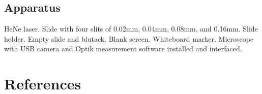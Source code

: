 \documentclass[
  letterpaper,
  DIV=11,
  numbers=noendperiod]{scrreprt}
\newlength{\cslhangindent}
\newenvironment{CSLReferences}[2] %
 {\begin{list}{}{%
  \setlength{\itemindent}{0pt}
  \setlength{\leftmargin}{0pt}
  \setlength{\parsep}{0pt}
  \ifodd #1
   \setlength{\leftmargin}{\cslhangindent}
   \setlength{\itemindent}{-1\cslhangindent}
  \fi
  \setlength{\itemsep}{#2\baselineskip}}}
 {\end{list}}
\begin{document}
\section{Apparatus}\label{apparatus-9}

HeNe laser. Slide with four slits of 0.02mm, 0.04mm, 0.08mm, and 0.16mm.
Slide holder. Empty slide and blutack. Blank screen. Whiteboard marker.
Microscope with USB camera and Optik measurement software installed and
interfaced.


\chapter*{References}\label{references}


\label{refs}
\begin{CSLReferences}{0}{1}
\end{CSLReferences}
\end{document}
